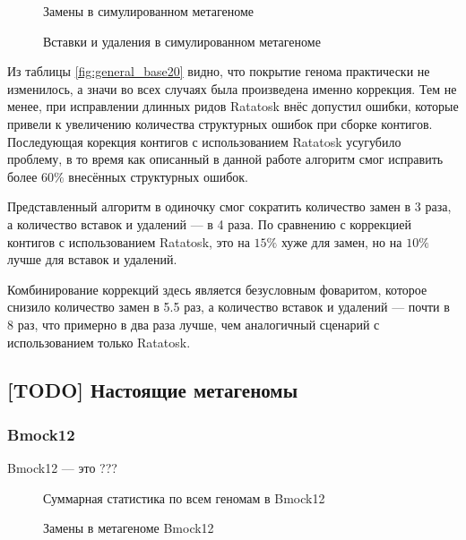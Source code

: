 \documentclass[14pt]{matmex-diploma-custom}
\begin{document}
\begin{figure}[h!]
    \centering
    
    \caption{Замены в симулированном метагеноме}
    \label{fig:mismatches_base20}
\end{figure}

\begin{figure}[h!]
    \centering
    
    \caption{Вставки и удаления в симулированном метагеноме}
    \label{fig:indels_base20}
\end{figure}

Из таблицы \ref{fig:general_base20} видно, что покрытие генома практически не изменилось, а значи во всех случаях была произведена именно коррекция. Тем не менее, при исправлении длинных ридов Ratatosk внёс допустил ошибки, которые привели к увеличению количества структурных ошибок при сборке контигов. Последующая корекция контигов с использованием Ratatosk усугубило проблему, в то время как описанный в данной работе алгоритм смог исправить более $60\%$ внесённых структурных ошибок.

Представленный алгоритм в одиночку смог сократить количество замен в 3 раза, а количество вставок и удалений --- в 4 раза. По сравнению с коррекцией контигов с использованием Ratatosk, это на $15\%$ хуже для замен, но на $10\%$ лучше для вставок и удалений.

Комбинирование коррекций здесь является безусловным фоваритом, которое снизило количество замен в 5.5 раз, а количество вставок и удалений --- почти в 8 раз, что примерно в два раза лучше, чем аналогичный сценарий с использованием только Ratatosk.

\subsection{[TODO] Настоящие метагеномы}
\subsubsection*{Bmock12}
Bmock12 --- это ???

\begin{figure}[h!]
    \centering
    
    \caption{Суммарная статистика по всем геномам в Bmock12}
    \label{fig:general_bmock12}
\end{figure}

\begin{figure}[h!]
    \centering
    
    \caption{Замены в метагеноме Bmock12}
    \label{fig:mismatches_bmock12}
\end{figure}
\end{document}
